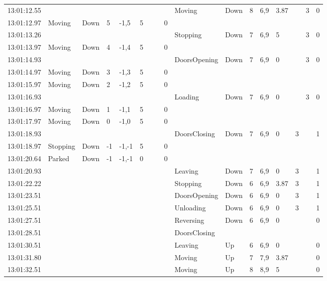 \documentclass{UoYCSproject}
\begin{document}
\begin{landscape}
\begin{longtable}{l || l | l | l | l | l | l | l | l || l | l | l | l | l | l | l | l}
	13:01:12.55 &  &  &  &  &  &  &  &  & Moving & Down & 8 & 6,9 & 3.87 &  & 3 & 0 \\
	13:01:12.97 & Moving & Down & 5 & -1,5 & 5 &  &  & 0 &  &  &  &  &  &  &  &  \\
	13:01:13.26 &  &  &  &  &  &  &  &  & Stopping & Down & 7 & 6,9 & 5 &  & 3 & 0 \\
	13:01:13.97 & Moving & Down & 4 & -1,4 & 5 &  &  & 0 &  &  &  &  &  &  &  &  \\
	13:01:14.93 &  &  &  &  &  &  &  &  & DoorsOpening & Down & 7 & 6,9 & 0 &  & 3 & 0 \\
	13:01:14.97 & Moving & Down & 3 & -1,3 & 5 &  &  & 0 &  &  &  &  &  &  &  &  \\
	13:01:15.97 & Moving & Down & 2 & -1,2 & 5 &  &  & 0 &  &  &  &  &  &  &  &  \\
	13:01:16.93 &  &  &  &  &  &  &  &  & Loading & Down & 7 & 6,9 & 0 &  & 3 & 0 \\
	13:01:16.97 & Moving & Down & 1 & -1,1 & 5 &  &  & 0 &  &  &  &  &  &  &  &  \\
	13:01:17.97 & Moving & Down & 0 & -1,0 & 5 &  &  & 0 &  &  &  &  &  &  &  &  \\
	13:01:18.93 &  &  &  &  &  &  &  &  & DoorsClosing & Down & 7 & 6,9 & 0 & 3 &  & 1 \\
	13:01:18.97 & Stopping & Down & -1 & -1,-1 & 5 &  &  & 0 &  &  &  &  &  &  &  &  \\
	13:01:20.64 & Parked & Down & -1 & -1,-1 & 0 &  &  & 0 &  &  &  &  &  &  &  &  \\
	13:01:20.93 &  &  &  &  &  &  &  &  & Leaving & Down & 7 & 6,9 & 0 & 3 &  & 1 \\
	13:01:22.22 &  &  &  &  &  &  &  &  & Stopping & Down & 6 & 6,9 & 3.87 & 3 &  & 1 \\
	13:01:23.51 &  &  &  &  &  &  &  &  & DoorsOpening & Down & 6 & 6,9 & 0 & 3 &  & 1 \\
	13:01:25.51 &  &  &  &  &  &  &  &  & Unloading & Down & 6 & 6,9 & 0 & 3 &  & 1 \\
	13:01:27.51 &  &  &  &  &  &  &  &  & Reversing & Down & 6 & 6,9 & 0 &  &  & 0 \\
	13:01:28.51 &  &  &  &  &  &  &  &  & DoorsClosing &  &  &  &  &  &  &  \\
	13:01:30.51 &  &  &  &  &  &  &  &  & Leaving & Up & 6 & 6,9 & 0 &  &  & 0 \\
	13:01:31.80 &  &  &  &  &  &  &  &  & Moving & Up & 7 & 7,9 & 3.87 &  &  & 0 \\
	13:01:32.51 &  &  &  &  &  &  &  &  & Moving & Up & 8 & 8,9 & 5 &  &  & 0 \\

\end{longtable}
\end{landscape}
\end{document}
